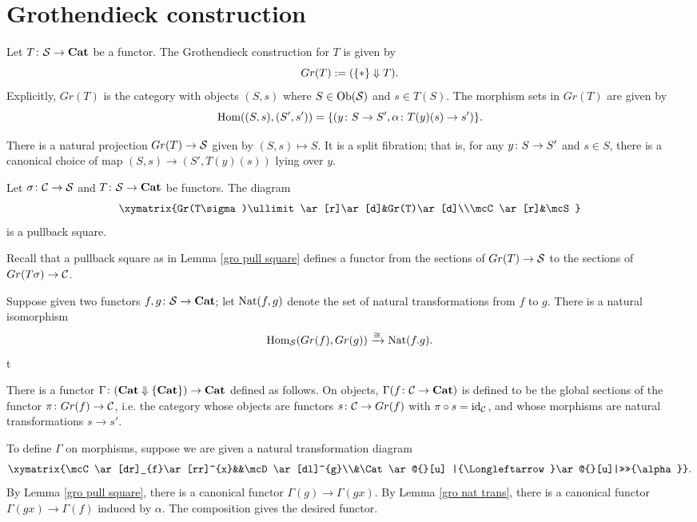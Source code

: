 \documentclass{amsart}
\makeatletter
\newcommand{\TriLeft}[7]{\xymatrix{#1\ar[dr]_{#2}\ar[rr]^{#3}&&#4\ar[dl]^{#5}\\&#6\ar@{}[u] |{\Longleftarrow}\ar@{}[u]|>>>>{#7}}}
\makeatother
\begin{document}
\section{Grothendieck construction}

Let $T\colon \mathcal{S}\rightarrow{\bf Cat}$ be a functor.  The Grothendieck construction for $T$ is given by $$Gr(T):=(\{*\}\Downarrow T).$$  Explicitly, $Gr(T)$ is the category with objects $(S,s)$ where $S\in\textnormal{Ob}(\mathcal{S})$ and $s\in T(S)$.  The morphism sets in $Gr(T)$ are given by $$\textnormal{Hom}((S,s),(S',s'))=\{(y\colon S\rightarrow S',\alpha\colon T(y)(s)\rightarrow s')\}.$$

There is a natural projection $Gr(T)\rightarrow\mathcal{S}$ given by $(S,s)\mapsto S$.  It is a split fibration; that is, for any $y\colon S\rightarrow S'$ and $s\in S$, there is a canonical choice of map $(S,s)\to (S',T(y)(s))$ lying over $y$.

\begin{lemma}\label{gro pull square}

Let $\sigma\colon\mathcal{C}\rightarrow\mathcal{S}$ and $T\colon\mathcal{S}\rightarrow{\bf Cat}$ be functors.  The diagram $$\xymatrix{Gr(T\sigma)\ullimit\ar[r]\ar[d]&Gr(T)\ar[d]\\\mcC\ar[r]&\mcS}$$ is a pullback square.

\end{lemma}

Recall that a pullback square as in Lemma \ref{gro pull square} defines a functor from the sections of $Gr(T)\rightarrow\mathcal{S}$ to the sections of $Gr(T\sigma)\rightarrow\mathcal{C}$.

\begin{lemma}\label{gro nat trans}

Suppose given two functors $f,g\colon\mathcal{S}\rightarrow{\bf Cat}$; let $\textnormal{Nat}(f,g)$ denote the set of natural transformations from $f$ to $g$.  There is a natural isomorphism $$\textnormal{Hom}_\mathcal{S}(Gr(f),Gr(g))\xrightarrow{\cong}\textnormal{Nat}(f.g).$$ t

\end{lemma}

\begin{definition}

There is a functor $\Gamma\colon({\bf Cat}\Downarrow\{{\bf Cat}\})\rightarrow{\bf Cat}$ defined as follows.  On objects, $\Gamma(f\colon\mathcal{C}\rightarrow{\bf Cat})$ is defined to be the global sections of the functor $\pi\colon Gr(f)\rightarrow\mathcal{C}$, i.e. the category whose objects are functors $s\colon\mathcal{C}\rightarrow Gr(f)$ with $\pi\circ s=\textnormal{id}_\mathcal{C}$, and whose morphisms are natural transformations $s\to s'$.  

To define $\Gamma$ on morphisms, suppose we are given a natural transformation diagram $$\TriLeft{\mcC}{f}{x}{\mcD}{g}{\Cat}{\alpha}.$$  By Lemma \ref{gro pull square}, there is a canonical functor $\Gamma(g)\to\Gamma(gx)$.  By Lemma \ref{gro nat trans}, there is a canonical functor $\Gamma(gx)\to\Gamma(f)$ induced by $\alpha$.  The composition gives the desired functor.

\end{definition}
\end{document}

